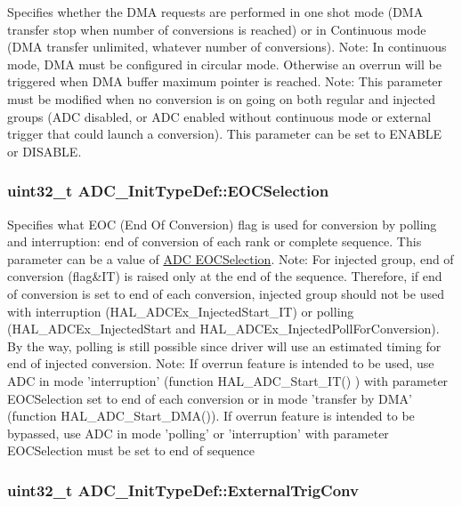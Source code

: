 Specifies whether the D\-M\-A requests are performed in one shot mode (D\-M\-A transfer stop when number of conversions is reached) or in Continuous mode (D\-M\-A transfer unlimited, whatever number of conversions). Note\-: In continuous mode, D\-M\-A must be configured in circular mode. Otherwise an overrun will be triggered when D\-M\-A buffer maximum pointer is reached. Note\-: This parameter must be modified when no conversion is on going on both regular and injected groups (A\-D\-C disabled, or A\-D\-C enabled without continuous mode or external trigger that could launch a conversion). This parameter can be set to E\-N\-A\-B\-L\-E or D\-I\-S\-A\-B\-L\-E. \hypertarget{struct_a_d_c___init_type_def_ae3eedd269c3acc6c6933e8a252c36e71}{
\subsubsection[{E\-O\-C\-Selection}]{\setlength{\rightskip}{0pt plus 5cm}uint32\-\_\-t A\-D\-C\-\_\-\-Init\-Type\-Def\-::\-E\-O\-C\-Selection}}\label{struct_a_d_c___init_type_def_ae3eedd269c3acc6c6933e8a252c36e71}
Specifies what E\-O\-C (End Of Conversion) flag is used for conversion by polling and interruption\-: end of conversion of each rank or complete sequence. This parameter can be a value of \hyperlink{group___a_d_c___e_o_c_selection}{A\-D\-C E\-O\-C\-Selection}. Note\-: For injected group, end of conversion (flag\&I\-T) is raised only at the end of the sequence. Therefore, if end of conversion is set to end of each conversion, injected group should not be used with interruption (H\-A\-L\-\_\-\-A\-D\-C\-Ex\-\_\-\-Injected\-Start\-\_\-\-I\-T) or polling (H\-A\-L\-\_\-\-A\-D\-C\-Ex\-\_\-\-Injected\-Start and H\-A\-L\-\_\-\-A\-D\-C\-Ex\-\_\-\-Injected\-Poll\-For\-Conversion). By the way, polling is still possible since driver will use an estimated timing for end of injected conversion. Note\-: If overrun feature is intended to be used, use A\-D\-C in mode 'interruption' (function H\-A\-L\-\_\-\-A\-D\-C\-\_\-\-Start\-\_\-\-I\-T() ) with parameter E\-O\-C\-Selection set to end of each conversion or in mode 'transfer by D\-M\-A' (function H\-A\-L\-\_\-\-A\-D\-C\-\_\-\-Start\-\_\-\-D\-M\-A()). If overrun feature is intended to be bypassed, use A\-D\-C in mode 'polling' or 'interruption' with parameter E\-O\-C\-Selection must be set to end of sequence \hypertarget{struct_a_d_c___init_type_def_a47aba277f9d8f3c5774983de4ce9455b}{
\subsubsection[{External\-Trig\-Conv}]{\setlength{\rightskip}{0pt plus 5cm}uint32\-\_\-t A\-D\-C\-\_\-\-Init\-Type\-Def\-::\-External\-Trig\-Conv}}\label{struct_a_d_c___init_type_def_a47aba277f9d8f3c5774983de4ce9455b}
